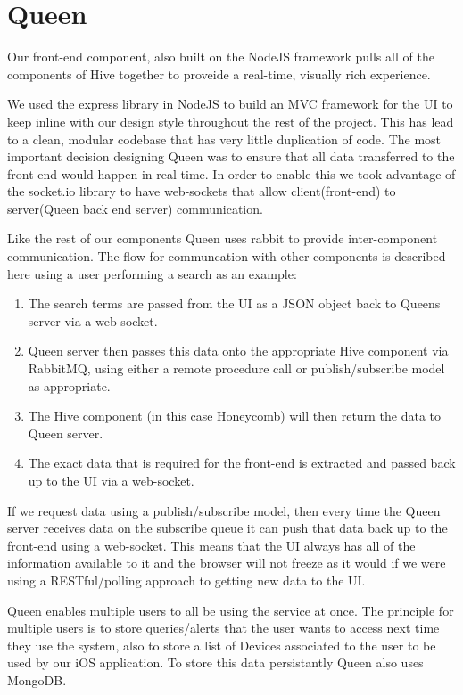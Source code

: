 \section{Queen}

Our front-end component, also built on the NodeJS framework pulls all of the
components of Hive together to proveide a real-time, visually rich experience.

We used the express library in NodeJS to build an MVC framework for the UI to
keep inline with our design style throughout the rest of the project. This has
lead to a clean, modular codebase that has very little duplication of code.
The most important decision designing Queen was to ensure that all data
transferred to the front-end would happen in real-time. In order to enable this
we took advantage of the socket.io library to have web-sockets that allow
client(front-end) to server(Queen back end server) communication.

Like the rest of our components Queen uses rabbit to provide inter-component
communication. The flow for communcation with other components is described here
using a user performing a search as an example:

\begin{enumerate}
  \item The search terms are passed from the UI as a JSON object back to Queens
  server via a web-socket.
  \item Queen server then passes this data onto the appropriate Hive component
  via RabbitMQ, using either a remote procedure call or publish/subscribe model
  as appropriate.
  \item The Hive component (in this case Honeycomb) will then return the data to
  Queen server.
  \item The exact data that is required for the front-end is extracted and
  passed back up to the UI via a web-socket.
\end{enumerate}

If we request data using a publish/subscribe model, then every time the Queen
server receives data on the subscribe queue it can push that data back up to the
front-end using a web-socket. This means that the UI always has all of the
information available to it and the browser will not freeze as it would if we
were using a RESTful/polling approach to getting new data to the UI.

Queen enables multiple users to all be using the service at once. The principle
for multiple users is to store queries/alerts that the user wants to access next
time they use the system, also to store a list of Devices associated to the user
to be used by our iOS application. To store this data persistantly Queen also uses
MongoDB.


